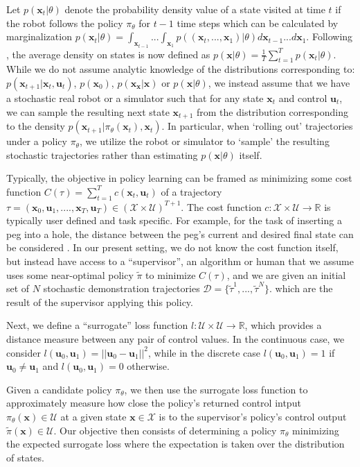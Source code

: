 \documentclass[10pt, conference]{ieeeconf}      %
\newcommand{\bu}{\mathbf{u}}
\newcommand{\bx}{\mathbf{x}}
\begin{document}
Let $p(\bx_t|\theta)$ denote the probability density value of a state visited at time $t$ if the robot follows the policy
$\pi_{\theta}$ for $t-1$ time steps which can be calculated by marginalization $p(\bx_t|\theta) =
\int_{\bx_{t-1}}...\int_{\bx_1} p((\bx_t,...,\bx_1)|\theta) d\bx_{t-1}...d\bx_1$. Following \cite{ross2010reduction},
the average density on states is now defined as $p(\bx|\theta) = \frac{1}{T} \sum^T_{t=1} p(\bx_t|\theta)$.
While we do not assume analytic knowledge of the distributions corresponding to: $p(\bx_{t+1}|\bx_t,\bu_t)$, $p(\bx_0)$, $p(\bx_{\bx}|
\bx)$ or $p(\bx|\theta)$, we instead assume that we have a stochastic real robot or a simulator such that for any state
$\bx_t$ and control $\bu_t$, we can sample the resulting next state $\bx_{t+1}$ from the distribution corresponding
to the density $p(\bx_{t+1}|\pi_{\theta}(\bx_t),\bx_t)$. In particular, when `rolling out' trajectories under a policy
$\pi_{\theta}$, we utilize the robot or simulator to `sample' the resulting stochastic trajectories rather than
estimating $p(\bx|\theta)$ itself.

Typically, the objective in policy learning can be framed as minimizing some cost function $C(\tau) = \sum^T_{t=1} c(\bx_t,\bu_t)$
of a trajectory $\tau = (\mathbf{x}_0,\mathbf{u}_1, ...., \mathbf{x}_T,\mathbf{u}_T)\in (\mathcal{X}\times
\mathcal{U})^{T+1}$. The cost function $c:\mathcal{X}\times \mathcal{U}\to \mathbb{R}$ is typically user defined and task specific. 
For example, for the task of inserting a peg into a hole, the distance between the peg's current and desired final state can
be considered \cite{levine2015end}.  In our present setting, we do not know the cost function itself, but instead have
access to a ``supervisor'', 
an algorithm or human that we assume uses some near-optimal policy $\tilde{\pi}$ to minimize $C(\tau)$, and we are given
an initial set of $N$ stochastic demonstration trajectories $\mathcal{D} = \lbrace \tilde{\tau}^1,...,\tilde{\tau}^N \rbrace$. 
which are the result of the supervisor applying this policy. 

Next, we define a ``surrogate'' loss function $l:\mathcal{U}\times \mathcal{U}\to \mathbb{R}$, which provides a distance
measure between any pair of control values. In the continuous case, we consider $l(\bu_0,\bu_1) = ||\bu_0-\bu_1||^2$,
while in the discrete case $l(\bu_0,\bu_1) = 1$ if $\bu_0 \neq \bu_1$ and $l(\bu_0, \bu_1)=0$ otherwise.

Given a candidate policy $\pi_{\theta}$, we then use the surrogate loss function to approximately measure how close the policy's
returned control intput $\pi_{\theta}(\bx)\in \mathcal{U}$ at a given state $\bx\in \mathcal{X}$ is to the supervisor's policy's control output
$\tilde{\pi}(\bx)\in \mathcal{U}$. Our objective then consists of determining a policy $\pi_{\theta}$ minimizing the expected surrogate loss where the expectation is taken over the distribution of states. 
\end{document}
